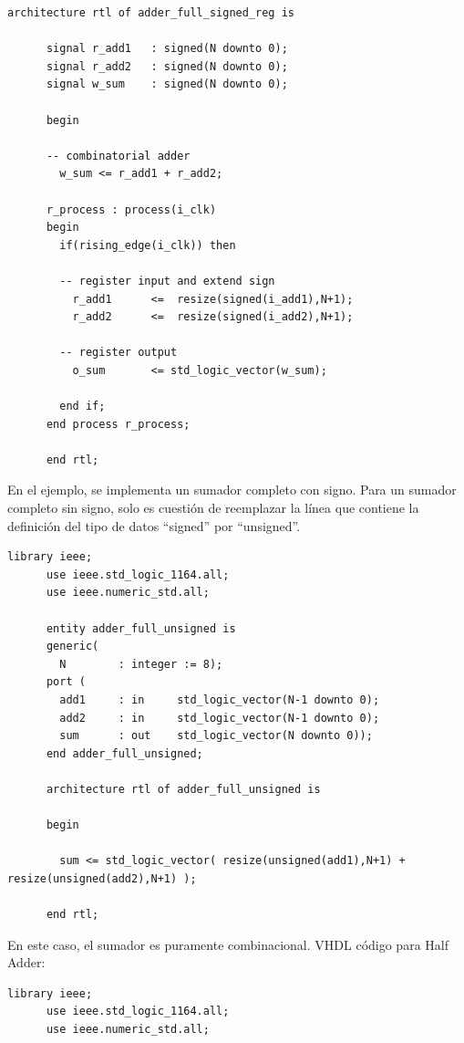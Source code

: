 \documentclass[12pt,letterpaper]{article}
\begin{document}
\begin{enumerate}
\begin{lstlisting}[style=vhdlstyle, caption={Código VHDL - Sumador con Registro}]
      architecture rtl of adder_full_signed_reg is
        
      signal r_add1   : signed(N downto 0);
      signal r_add2   : signed(N downto 0);
      signal w_sum    : signed(N downto 0);
      
      begin
      
      -- combinatorial adder
        w_sum <= r_add1 + r_add2;
        
      r_process : process(i_clk)
      begin
        if(rising_edge(i_clk)) then

        -- register input and extend sign
          r_add1      <=  resize(signed(i_add1),N+1);
          r_add2      <=  resize(signed(i_add2),N+1);
        
        -- register output
          o_sum       <= std_logic_vector(w_sum);
        
        end if;
      end process r_process;

      end rtl;
    \end{lstlisting}
    
    En el ejemplo, se implementa un sumador completo con signo. Para un sumador completo sin signo, solo es cuesti\'{o}n de reemplazar la línea que contiene la definición del tipo de datos “signed” por “unsigned”.\\
    
    \begin{lstlisting}[style=vhdlstyle, caption={Código VHDL - Sumador sin Registro}]
      library ieee;
      use ieee.std_logic_1164.all;
      use ieee.numeric_std.all;
      
      entity adder_full_unsigned is
      generic(
        N        : integer := 8);
      port (
        add1     : in     std_logic_vector(N-1 downto 0);
        add2     : in     std_logic_vector(N-1 downto 0);
        sum      : out    std_logic_vector(N downto 0));
      end adder_full_unsigned;
      
      architecture rtl of adder_full_unsigned is
      
      begin
      
        sum <= std_logic_vector( resize(unsigned(add1),N+1) + resize(unsigned(add2),N+1) );

      end rtl;
    \end{lstlisting}
    
    En este caso, el sumador es puramente combinacional.
    VHDL código para Half Adder:\\
    \begin{lstlisting}[style=vhdlstyle, caption={Código VHDL - Medio Sumador}]
      library ieee;
      use ieee.std_logic_1164.all;
      use ieee.numeric_std.all;


\end{lstlisting}
\end{enumerate}
\end{document}
